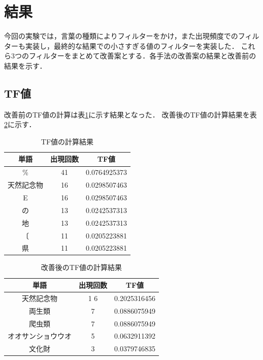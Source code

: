 \documentclass[a4paper,11pt]{ltjsarticle}
\begin{document}
\section{結果}
今回の実験では，言葉の種類によりフィルターをかけ，また出現頻度でのフィルターも実装し，最終的な結果での小さすぎる値のフィルターを実装した．
これら3つのフィルターをまとめて改善案とする．各手法の改善案の結果と改善前の結果を示す．
\subsection{TF値}
改善前のTF値の計算は表\ref{tab:TF-result}に示す結果となった．
改善後のTF値の計算結果を表\ref{tab:TF-result2}に示す．
\begin{table}[htbp]
    \centering
    \caption{TF値の計算結果}
    \label{tab:TF-result}
    \begin{tabular}{|c|c|c|}
        \hline
        単語    & 出現回数 & TF値          \\
        \hline
        \%    & 41   & 0.0764925373 \\
        \hline
        天然記念物 & 16   & 0.0298507463 \\
        \hline
        E     & 16   & 0.0298507463 \\
        \hline
        の     & 13   & 0.0242537313 \\
        \hline
        地     & 13   & 0.0242537313 \\
        \hline
        〔     & 11   & 0.0205223881 \\
        \hline
        県     & 11   & 0.0205223881 \\
        \hline
    \end{tabular}
\end{table}
\begin{table}[htbp]
    \centering
    \caption{改善後のTF値の計算結果}
    \label{tab:TF-result2}
    \begin{tabular}{|c|c|c|}
        \hline
        単語        & 出現回数    & TF値          \\
        \hline
        天然記念物     & 1     6 & 0.2025316456 \\
        \hline
        両生類       & 7       & 0.0886075949 \\
        \hline
        爬虫類       & 7       & 0.0886075949 \\
        \hline
        オオサンショウウオ & 5       & 0.0632911392 \\
        \hline
        文化財       & 3       & 0.0379746835 \\
        \hline
    \end{tabular}
\end{table}
\newpage
\end{document}
